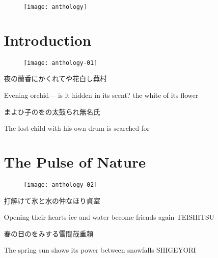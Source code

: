 
\begin{figure}
    \thispagestyle{empty}
    \centering
    \texttt{[image: anthology]}
\end{figure}

\chapter{Introduction}

\begin{figure}
    \texttt{[image: anthology-01]}
\end{figure}

\setcounter{haikucounter}{0}

\begin{haiku}
    {\FH 夜の蘭香にかくれてや花白し}\hfill{\FH 蕪村}

    \vin{} Evening orchid---
    \vin{} \vin{} is it hidden in its scent?
    \vin{} \vin{} \vin{} the white of its flower

\end{haiku}

\begin{haiku}
    {\FH まよひ子のをの太鼓られ}\hfill{\FH 無名氏}

    \vin{} The lost child
    \vin{} \vin{} with his own drum
    \vin{} \vin{} \vin{} is searched for
\end{haiku}

\chapter{The Pulse of Nature}

\begin{figure}
    \texttt{[image: anthology-02]}
\end{figure}

\begin{haiku}
    {\FH 打解けて氷と水の仲なほり}\hfill{\FH 貞室}

    \vin{} Opening their hearts
    \vin{} \vin{} ice and water become
    \vin{} \vin{} \vin{} friends again
    \hspace*{\fill} TEISHITSU
\end{haiku}

\begin{haiku}
    {\FH 春の日のをみする雪間哉}\hfill{\FH 重頼}

    \vin{} The spring sun
    \vin{} \vin{} shows its power
    \vin{} \vin{} \vin{} between snowfalls \hspace{\fill} SHIGEYORI
\end{haiku}

